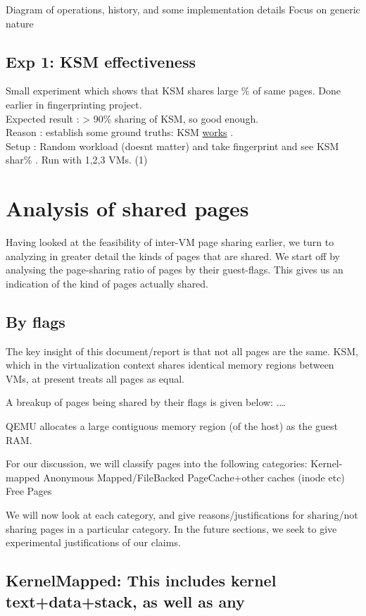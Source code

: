 \documentclass[10pt,a4paper]{article}
\begin{document}
Diagram of operations, history, and some implementation details
Focus on generic nature
\subsection{Exp 1: KSM effectiveness}

Small experiment which shows that KSM shares large \% of same pages. Done earlier in fingerprinting project. \\
Expected result : > 90\% sharing of KSM, so good enough.\\
Reason : establish some ground truths: KSM \underline{works} .\\
Setup : Random workload (doesnt matter) and take fingerprint and see KSM shar\% . Run with 1,2,3 VMs.
(1)

\section{Analysis of shared pages}
Having looked at the feasibility of inter-VM page sharing earlier, we turn to analyzing in greater detail the kinds of pages that are shared. 
We start off by analysing the page-sharing ratio of pages by their guest-flags. This gives us an indication of the kind of pages actually shared. 

\subsection{By flags}

The key insight of this document/report is that not all pages are the
same. KSM, which in the virtualization context shares identical memory
regions between VMs, at present treats all pages as equal. 

A breakup of pages being shared by their flags is given below:
.\ldots{}

QEMU allocates a large contiguous memory region (of the host) as the
guest RAM.

For our discussion, we will classify pages into the following
categories:
Kernel-mapped
Anonymous
Mapped/FileBacked
PageCache+other caches (inode etc)
Free Pages

We will now look at each category, and give reasons/justifications for
sharing/not sharing pages in a particular category. In the future
sections, we seek to give experimental justifications of our claims.

\subsection{KernelMapped: This includes kernel text+data+stack, as well as any}
\end{document}
